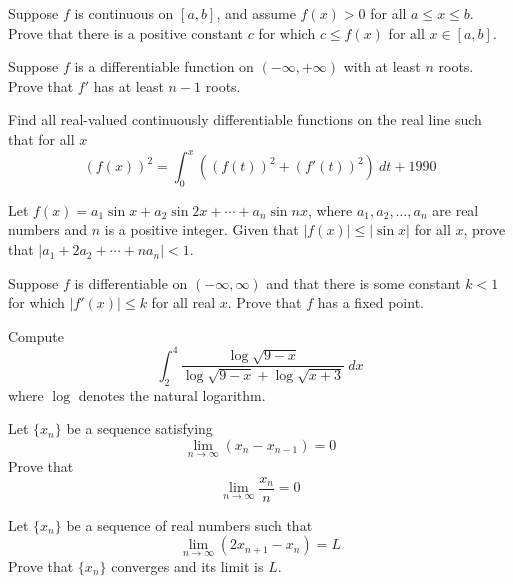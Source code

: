 \documentclass[12pt]{article}
\begin{document}
        \begin{exercise}
            Suppose $f$ is continuous on $[a,b]$, and assume $f(x)>0$ for all $a\leq x \leq b$. Prove that there is a positive constant $c$ for which $c\leq f(x)$ for all $x\in [a,b]$.
        \end{exercise}
            
        \begin{exercise}
            Suppose $f$ is a differentiable function on $(-\infty, +\infty)$ with at least $n$ roots. Prove that $f'$ has at least $n-1$ roots.
        \end{exercise}
            
        \begin{exercise}
            Find all real-valued continuously differentiable functions on the real line such that for all $x$
            \[(f(x))^2 = \int_0^x \left((f(t))^2 + (f'(t))^2\right)\ dt + 1990\]
        \end{exercise}
            
        \begin{exercise} Let $f(x)=a_1\sin{x}+a_2\sin{2x}+\cdots + a_n\sin{nx}$, where $a_1,a_2,\dots,a_n$ are real numbers and $n$ is a positive integer. Given that $|f(x)|\leq |\sin{x}|$ for all $x$, prove that $|a_1+2a_2+\cdots+na_n|<1$.
        \end{exercise}
            
        \begin{exercise}
            Suppose $f$ is differentiable on $(-\infty, \infty)$ and that there is some constant $k<1$ for which $|f'(x)|\leq k$ for all real $x$. Prove that $f$ has a fixed point. 
        \end{exercise}
            
        \begin{exercise}
            Compute
            \[\int_2^4 \frac{\log\sqrt{9-x}}{\log\sqrt{9-x}+\log\sqrt{x+3}}\ dx\] where $\log$ denotes the natural logarithm.
        \end{exercise}

        \begin{exercise}
            Let $\{x_n\}$ be a sequence satisfying \[\lim_{n\to\infty} (x_n-x_{n-1}) = 0\] Prove that \[\lim_{n\to\infty} \frac{x_n}{n}= 0\]
        \end{exercise}
            
        \begin{exercise}
            Let $\{x_n\}$ be a sequence of real numbers such that \[ \lim_{n\to\infty} (2x_{n+1}-x_n)=L\] Prove that $\{x_n\}$ converges and its limit is $L$.
        \end{exercise}
\end{document}
